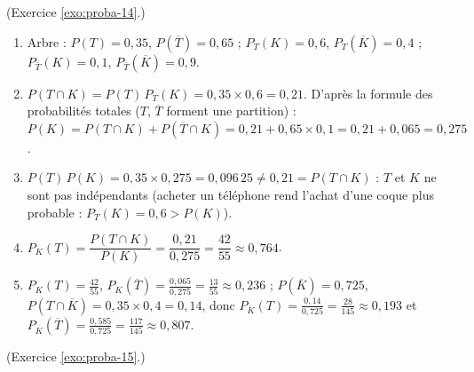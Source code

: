 \begin{corrige}
\begin{sol}
\begin{enumerate}
\end{enumerate}
\end{sol}
%
\begin{sol} (Exercice \ref{exo:proba-14}.)
\begin{enumerate}
\item Arbre : $P(T) = 0,35$, $P(\overline{T}) = 0,65$ ; $P_T(K) = 0,6$, $P_T(\overline{K}) = 0,4$ ; $P_{\overline{T}}(K) = 0,1$, $P_{\overline{T}}(\overline{K}) = 0,9$.
      \begin{center}
      \end{center}
\item $P(T\cap K) = P(T)\,P_T(K) = 0,35\times 0,6 = 0,21$. D'apr\`es la formule des probabilit\'es totales ($T$, $\overline{T}$ forment une partition) :
      $P(K) = P(T\cap K) + P(\overline{T}\cap K) = 0,21 + 0,65\times 0,1 = 0,21 + 0,065 = 0,275$.
\item $P(T)\,P(K) = 0,35\times 0,275 = 0,096\,25 \neq 0,21 = P(T\cap K)$ : $T$ et $K$ ne sont pas ind\'ependants
      (acheter un t\'el\'ephone rend l'achat d'une coque plus probable : $P_T(K) = 0,6 > P(K)$).
\item $P_K(T) = \dfrac{P(T\cap K)}{P(K)} = \dfrac{0,21}{0,275} = \dfrac{42}{55}\approx 0,764$.
\item $P_K(T) = \frac{42}{55}$, $P_K(\overline{T}) = \frac{0,065}{0,275} = \frac{13}{55}\approx 0,236$ ;
      $P(\overline{K}) = 0,725$, $P(T\cap\overline{K}) = 0,35\times 0,4 = 0,14$, donc
      $P_{\overline{K}}(T) = \frac{0,14}{0,725} = \frac{28}{145}\approx 0,193$ et
      $P_{\overline{K}}(\overline{T}) = \frac{0,585}{0,725} = \frac{117}{145}\approx 0,807$.
\end{enumerate}
\end{sol}
%
\begin{sol} (Exercice \ref{exo:proba-15}.)

\end{sol}
\end{corrige}
